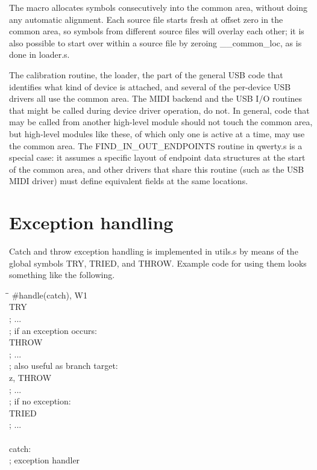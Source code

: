 The  macro allocates symbols consecutively into the common
area, without doing any automatic alignment.  Each source file starts fresh
at offset zero in the common area, so symbols from different source files
will overlay each other; it is also possible to start over within a source
file by zeroing \_\_common\_loc, as is done in loader.s.

The calibration routine, the loader, the part of the general USB code that
identifies what kind of device is attached, and several of the per-device
USB drivers all use the common area.  The MIDI backend and the USB I/O
routines that might be called during device driver operation, do not.  In
general, code that may be called from another high-level module should not
touch the common area, but high-level modules like these, of which only one
is active at a time, may use the common area.  The FIND\_IN\_OUT\_ENDPOINTS
routine in qwerty.s is a special case: it assumes a specific layout of
endpoint data structures at the start of the common area, and other drivers
that share this routine (such as the USB MIDI driver) must define equivalent
fields at the same locations.

\section{Exception handling}

Catch and throw exception handling is implemented in utils.s by means of the
global symbols TRY, TRIED, and THROW.  Example code for using them looks
something like the following.

\begin{tabbing}
\qquad\=\qquad\qquad\=\kill
\>\>\#handle(catch), W1\\
\>\>TRY\\
\>\quad; ...\\
\>\quad; if an exception occurs:\\
\>\quad{}\>\quad THROW\\
\>\quad; ...\\
\>\quad; also useful as branch target:\\
\>\quad{}\>\quad z, THROW\\
\>\quad; ...\\
\>; if no exception:\\
\>\>TRIED\\
\>; ...\\
\\
catch:\\
\>; exception handler \\
\end{tabbing}

